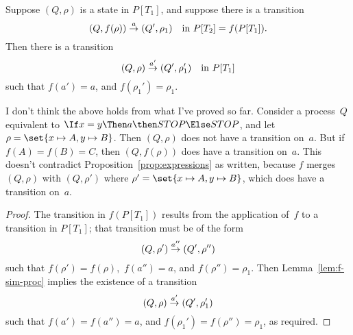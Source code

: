 



\begin{lemma}
Suppose $(Q, \rho)$ is a state in $P[T_1]$, and suppose there is a transition
\[
(Q, f(\rho)) \stackrel{a}{\rightarrow} (Q',\rho_1)  \quad \mbox{in $P[T_2] = f(P[T_1])$.}
\]
Then there is a transition 
\[
(Q, \rho) \stackrel{a'}{\rightarrow} (Q', \rho_1') \quad \mbox{in $P[T_1]$}
\]
such that $f(a') = a$, and $f(\rho_1') = \rho_1$.
\end{lemma}


I don't think the above holds from what I've proved so far.  Consider a
process~$Q$ equivalent to $\If x = y \Then a \then STOP \Else STOP$, and let
$\rho = \set{x \mapsto A, y \mapsto B}$.  Then $(Q,\rho)$ does not have a
transition on~$a$.  But if $f(A) = f(B) = C$, then $(Q,f(\rho))$ does have a
transition on~$a$.  This doesn't contradict Proposition~\ref{prop:expressions}
as written, because $f$ merges $(Q,\rho)$ with $(Q,\rho')$ where $\rho' =
\set{x \mapsto A, y \mapsto B}$, which does have a transition on~$a$. 


\begin{proof}
The transition in $f(P[T_1])$ results from the application of~$f$ to a
transition in $P[T_1]$; that transition must be of the form
\[
(Q, \rho') \trans{a''} (Q', \rho'') %
\]
such that $f(\rho') = f(\rho)$,\, $f(a'') = a$, and $f(\rho'') = \rho_1$.
Then Lemma~\ref{lem:f-sim-proc} implies the existence of a transition
\[
(Q, \rho) \trans{a'} (Q', \rho_1') %
\]
such that $f(a') = f(a'') = a$, and $f(\rho_1') = f(\rho'') = \rho_1$, as
required. 
\end{proof}





